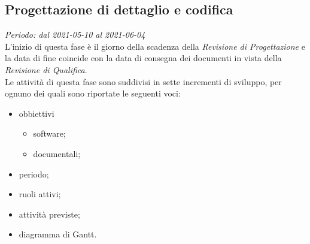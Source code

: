 \subsection{Progettazione di dettaglio e codifica}
\textit{Periodo: dal 2021-05-10 al 2021-06-04}\\
L'inizio di questa fase è il giorno della scadenza della \textit{Revisione di Progettazione} e la data di fine coincide con la data di consegna dei documenti in vista della \textit{Revisione di Qualifica}.\\
Le attività di questa fase sono suddivisi in sette incrementi di sviluppo, per ognuno dei quali sono riportate le seguenti voci:
\begin{itemize}
    \item obbiettivi
          \begin{itemize}
              \item software;
              \item documentali;
          \end{itemize}
    \item periodo;
    \item ruoli attivi;
    \item attività previste;
    \item diagramma di Gantt.
\end{itemize}

